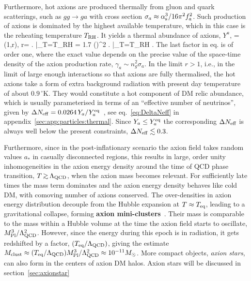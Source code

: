 Furthermore, hot axions are produced thermally from gluon 
and quark scatterings,
such as $gg\to g a$ with cross section $\sigma_a \approx \alpha_{\rm s}^3/16\pi^2 f_a^2$.
Such production of axions is dominated by the highest available temperature, which in this case is 
the reheating temperature $T_{\rm RH}$. It yields a thermal abundance of axions, $Y^a$,
\beq {} =\min(1,r),\qquad
\label{eq:r}
r= \left.
\right|_{T=T_{\rm RH}} = 1.7  \left(\right)^2
\left.  \right|_{T=T_{\rm RH}} .
\eeq
The last factor in eq. is of order one, where the exact value depends on the precise value 
of the space-time density of the axion production rate, $\gamma_a \sim n^2_g \sigma_a$.
In the limit $r > 1$, i.e., in the limit of large enough interactions so that axions are fully thermalised, 
the hot axions take a form of extra background radiation with present day temperature of about $0.9\,^\circ$K.  
They would constitute a hot component of DM relic abundance, which is usually parameterised in terms of an 
``effective number of neutrinos'', given by
$\Delta N_{\rm eff} = 0.0264\, Y_a/Y_a^{\rm eq} $~\cite{HotAxions}, see eq.~\eqref{eq:DeltaNeff} in appendix~\ref{sec:app:particles:thermal}. Since $Y_a\leq Y_a^{\rm eq}$ the corresponding $\Delta N_{\rm eff}$ is always well below the present constraints,  $\Delta N_{\rm eff}\lesssim 0.3$.


Furthermore, since in the post-inflationary scenario the axion field takes random values $a_*$ in casually disconnected regions, this results in large, order unity inhomogeneities in the axion energy density around the time of QCD phase transition, $T \circa{>} \Lambda_{\rm QCD}$, when the axion mass becomes relevant. For sufficiently late times the mass term dominates and the axion energy density behaves like cold DM, with comoving number of axions conserved.
The over-densities in axion energy distribution  decouple from the Hubble expansion at $T\approx T_{\rm eq}$, leading to a gravitational collapse,  forming {\bf axion mini-clusters}~\cite{axion:mini:clusters}. 
Their mass is  comparable 
to the mass within a Hubble volume at the time the axion field starts to oscillate, $M_{\rm Pl}^3/\Lambda_{\rm QCD}^2$. 
However, since the energy during this epoch is in radiation, it gets redshifted by a factor, $(T_{\rm eq}/\Lambda_{\rm QCD})$, 
giving the  estimate $M_{\text{clust}}\approx (T_{\rm eq}/\Lambda_{\rm QCD}) M_{\rm Pl}^3/\Lambda_{\rm QCD}^2 \approx 10^{-11} M_{\odot}$.
More compact objects, 
{\em axion stars}, can also form in the centers of axion DM halos.
Axion stars will be discussed in section~\ref{sec:axionstar}

